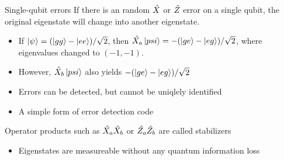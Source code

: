\documentclass{beamer}
\begin{document}
    \begin{frame}{Single-qubit errors}
        If there is an random $ \shat{X} $ or $ \shat{Z} $ error on a single qubit, the original eigenstate will change into another eigenstate.
        \begin{itemize}
            \item If $ \ket{\psi} = (\ket{gg} - \ket{ee})/\sqrt{2}$, then $ \sshat{X_a}\ket{psi} = -(\ket{ge} - \ket{eg})/\sqrt{2}$, where eigenvalues changed to $ (-1, -1) $.
            \item However, $ \sshat{X_b}\ket{psi}$ also yields $ -(\ket{ge} - \ket{eg})/\sqrt{2}$
            \item Errors can be detected, but cannot be uniqlely identified
            \item A simple form of error detection code
        \end{itemize}
        Operator products such as $ \sshat{X_a}\sshat{X_b} $ or $ \sshat{Z_a}\sshat{Z_b} $ are called stabilizers
        \begin{itemize}
            \item Eigenstates are measureable without any quantum information loss
        \end{itemize}
    \end{frame}
    
\end{document}
